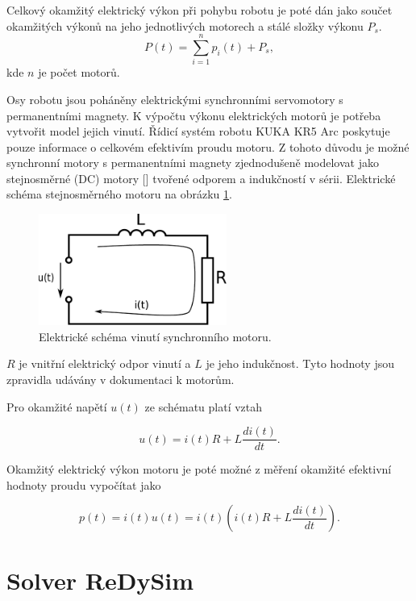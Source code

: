 Celkový okamžitý elektrický výkon při pohybu robotu je poté dán jako součet okamžitých výkonů na jeho jednotlivých motorech a stálé složky výkonu $P_s$.
\begin{equation}
P(t) = \sum_{i=1}^{n} p_i(t) + P_s,
\label{robot_motor_power_eq}
\end{equation} 
kde $n$ je počet motorů.

Osy robotu jsou poháněny elektrickými synchronními servomotory s permanentními magnety. K výpočtu výkonu elektrických motorů je potřeba vytvořit model jejich vinutí. Řídicí systém robotu KUKA KR5 Arc poskytuje pouze informace o celkovém efektivím proudu motoru. Z tohoto důvodu je možné synchronní motory s permanentními magnety zjednodušeně modelovat jako stejnosměrné (DC) motory [\cite{sbornik}] tvořené odporem a indukčností v sérii. Elektrické schéma stejnosměrného motoru na obrázku \ref{schema_motoru_pic}.  

\begin{figure}[ht]
\includegraphics[width=0.55\textwidth]{obvod_motoru}
\caption{Elektrické schéma vinutí synchronního motoru.}
\label{schema_motoru_pic}
\end{figure}

$R$ je vnitřní elektrický odpor vinutí a $L$ je jeho indukčnost. Tyto hodnoty jsou zpravidla udávány v dokumentaci k motorům.

Pro okamžité napětí $u(t)$ ze schématu platí vztah

\begin{equation}
u(t) = i(t)R + L\frac{di(t)}{dt}.
\label{motor_voltage_eq}
\end{equation}  

Okamžitý elektrický výkon motoru je poté možné z měření okamžité efektivní hodnoty proudu vypočítat jako
 
\begin{equation}
p(t) = i(t)u(t) = i(t)\left(i(t)R + L\frac{di(t)}{dt}\right).
\label{motor_power_eq}
\end{equation} 

\section{Solver ReDySim}

